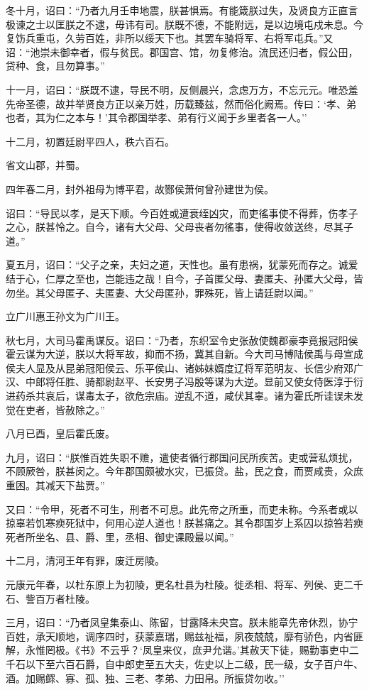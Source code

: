 \documentclass[]{article}
\begin{document}
冬十月，诏曰：``乃者九月壬申地震，朕甚惧焉。有能箴朕过失，及贤良方正直言极谏之士以匡朕之不逮，毋讳有司。朕既不德，不能附远，是以边境屯戍未息。今复饬兵重屯，久劳百姓，非所以绥天下也。其罢车骑将军、右将军屯兵。''又诏：``池崇未御幸者，假与贫民。郡国宫、馆，勿复修治。流民还归者，假公田，贷种、食，且勿算事。''

十一月，诏曰：``朕既不逮，导民不明，反侧晨兴，念虑万方，不忘元元。唯恐羞先帝圣德，故并举贤良方正以亲万姓，历载臻兹，然而俗化阙焉。传曰：`孝、弟也者，其为仁之本与！'其令郡国举孝、弟有行义闻于乡里者各一人。''

十二月，初置廷尉平四人，秩六百石。

省文山郡，并蜀。

四年春二月，封外祖母为博平君，故酂侯萧何曾孙建世为侯。

诏曰：``导民以孝，是天下顺。今百姓或遭衰绖凶灾，而吏徭事使不得葬，伤孝子之心，朕甚怜之。自今，诸有大父母、父母丧者勿徭事，使得收敛送终，尽其子道。''

夏五月，诏曰：``父子之亲，夫妇之道，天性也。虽有患祸，犹蒙死而存之。诚爱结于心，仁厚之至也，岂能违之哉！自今，子首匿父母、妻匿夫、孙匿大父母，皆勿坐。其父母匿子、夫匿妻、大父母匿孙，罪殊死，皆上请廷尉以闻。''

立广川惠王孙文为广川王。

秋七月，大司马霍禹谋反。诏曰：``乃者，东织室令史张赦使魏郡豪李竟报冠阳侯霍云谋为大逆，朕以大将军故，抑而不扬，冀其自新。今大司马博陆侯禹与母宣成侯夫人显及从昆弟冠阳侯云、乐平侯山、诸姊妹婿度辽将军范明友、长信少府邓广汉、中郎将任胜、骑都尉赵平、长安男子冯殷等谋为大逆。显前又使女侍医淳于衍进药杀共哀后，谋毒太子，欲危宗庙。逆乱不道，咸伏其辜。诸为霍氏所诖误未发觉在吏者，皆赦除之。''

八月已酉，皇后霍氏废。

九月，诏曰：``朕惟百姓失职不赡，遣使者循行郡国问民所疾苦。吏或营私烦扰，不顾厥咎，朕甚闵之。今年郡国颇被水灾，已振贷。盐，民之食，而贾咸贵，众庶重困。其减天下盐贾。''

又曰：``令甲，死者不可生，刑者不可息。此先帝之所重，而吏未称。今系者或以掠辜若饥寒瘐死狱中，何用心逆人道也！朕甚痛之。其令郡国岁上系囚以掠笞若瘐死者所坐名、县、爵、里，丞相、御史课殿最以闻。''

十二月，清河王年有罪，废迁房陵。

元康元年春，以杜东原上为初陵，更名杜县为杜陵。徙丞相、将军、列侯、吏二千石、訾百万者杜陵。

三月，诏曰：``乃者凤皇集泰山、陈留，甘露降未央宫。朕未能章先帝休烈，协宁百姓，承天顺地，调序四时，获蒙嘉瑞，赐兹祉福，夙夜兢兢，靡有骄色，内省匪解，永惟罔极。《书》不云乎？`凤皇来仪，庶尹允谐。'其赦天下徒，赐勤事吏中二千石以下至六百石爵，自中郎吏至五大夫，佐史以上二级，民一级，女子百户牛、酒。加赐鳏、寡、孤、独、三老、孝弟、力田帛。所振贷勿收。''
\end{document}
